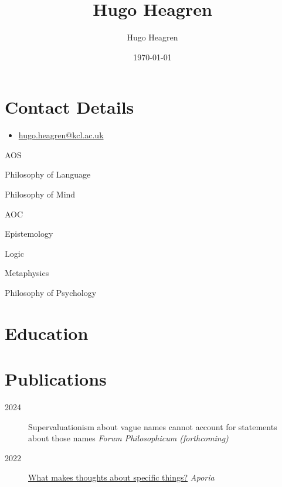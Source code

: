 \documentclass{cv}
\author{Hugo Heagren}
\date{\today}
\title{Hugo Heagren}
\begin{document}
\maketitle
\nocite{*}

\section*{Contact Details}
\begin{itemize}
\item \href{mailto:hugo.heagren@kcl.ac.uk}{hugo.heagren@kcl.ac.uk}
\end{itemize}

\begin{areas}
\item[{AOS}]%
  \begin{area}
  \item Philosophy of Language
  \item Philosophy of Mind
  \end{area}
\item[{AOC}]%
  \begin{area}
  \item Epistemology
  \item Logic
  \item Metaphysics
  \item Philosophy of Psychology
\end{area}
\end{areas}

\section*{Education}
\printbibliography[check=Education]{}

\section*{Publications}
\begin{description}
\item[{2024}] Supervaluationism about vague names cannot account for statements about those names \textit{Forum Philosophicum (forthcoming)}
\item[{2022}] \href{https://ojs.st-andrews.ac.uk/index.php/aporia/article/view/2451}{What makes thoughts about specific things?} \emph{Aporia}
\end{description}
\end{document}
